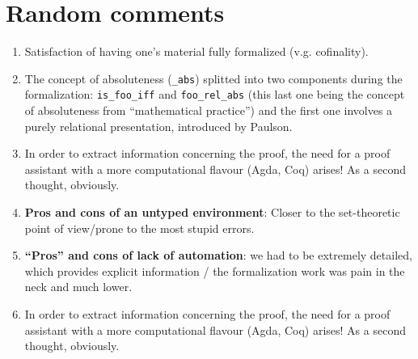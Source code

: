 \section{Random comments}

\begin{enumerate}
\item Satisfaction of having one's material fully formalized
  (v.g. cofinality).
\item The concept of absoluteness (\verb|_abs|) splitted into two components
  during the formalization: \verb|is_foo_iff| and \verb|foo_rel_abs| (this last one
  being the concept of absoluteness from  “mathematical practice”) and
  the first one involves a purely relational presentation, introduced
  by Paulson.
\item
  In order to extract information concerning the proof, the need for a
  proof assistant with a more computational flavour (Agda, Coq)
  arises! As a second thought, obviously.
\item  \textbf{Pros and cons of an untyped environment}: Closer to the
  set-theoretic point of view/prone to the most stupid errors.
\item \textbf{“Pros” and cons of lack of automation}: we had to be extremely
  detailed, which provides explicit information / the formalization
  work was pain in the neck and much lower.
\item In order to extract information concerning the proof, the need for a
  proof assistant with a more computational flavour (Agda, Coq)
  arises! As a second thought, obviously.
\end{enumerate}

